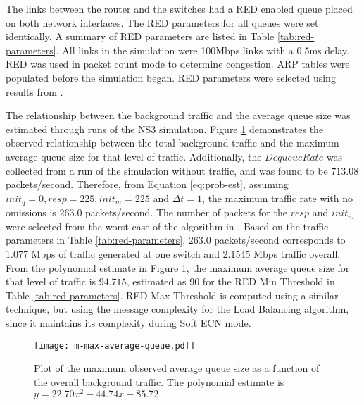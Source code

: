 The links between the router and the switches had a \ac{RED} enabled queue placed on both network interfaces.
The \ac{RED} parameters for all queues were set identically.
A summary of \ac{RED} parameters are listed in Table \ref{tab:red-parameters}.
All links in the simulation were 100Mbps links with a 0.5ms delay.
RED was used in packet count mode to determine congestion.
ARP tables were populated before the simulation began.
\ac{RED} parameters were selected using results from \cite{JOURNAL}.

The relationship between the background traffic and the average queue size was estimated through runs of the \ac{NS3} simulation.
Figure \ref{fig:plotm} demonstrates the observed relationship between the total background traffic and the maximum average queue size for that level of traffic.
Additionally, the $DequeueRate$ was collected from a run of the simulation without traffic, and was found to be $713.08$ packets/second.
Therefore, from Equation \ref{eq:prob-est}, assuming $init_q=0, resp=225, init_m=225$ and $\Delta t=1$, the maximum traffic rate with no omissions is $263.0$ packets/second.
The number of packets for the $resp$ and $init_m$ were selected from the worst case of the algorithm in \cite{JOURNAL}.
Based on the traffic parameters in Table \ref{tab:red-parameters}, $263.0$ packets/second corresponds to 1.077 Mbps of traffic generated at one switch and 2.1545 Mbps traffic overall.
From the polynomial estimate in Figure \ref{fig:plotm}, the maximum average queue size for that level of traffic is $94.715$, estimated as $90$ for the \ac{RED} Min Threshold in Table \ref{tab:red-parameters}.
RED Max Threshold is computed using a similar technique, but using the message complexity for the Load Balancing algorithm, since it maintains its complexity during Soft ECN mode.

\begin{figure}
\centering
\texttt{[image: m-max-average-queue.pdf]}
\caption{Plot of the maximum observed average queue size as a function of the overall background traffic. The polynomial estimate is $y=22.70x^2-44.74x+85.72$}
\label{fig:plotm}
\end{figure}

